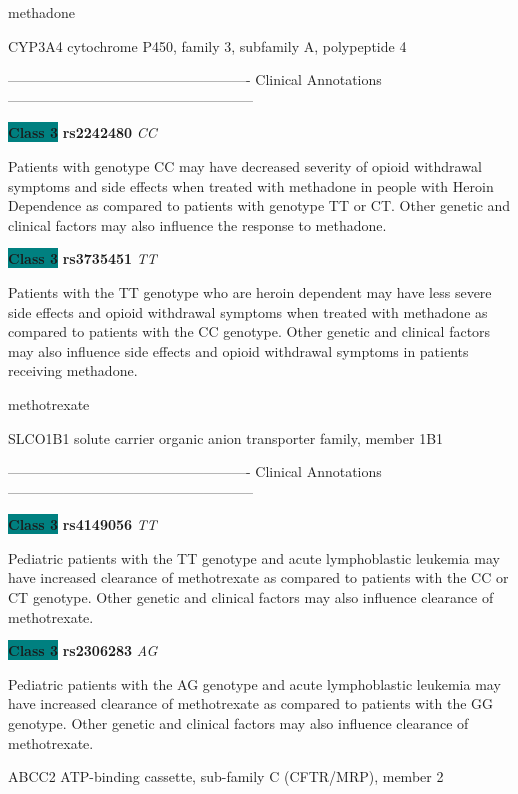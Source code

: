 \documentclass{resume} %
\begin{document}
\begin{rSection}{ methadone }
\begin{rSubsection}{ CYP3A4 }{ cytochrome P450, family 3, subfamily A, polypeptide 4 }{}{}
\item[] ---------------------------------------------------- Clinical Annotations -----------------------------------------------------\newline
\item \textbf{\colorbox{teal} {Class 3}} \textbf{ rs2242480 } \textit{ CC }
\item[] Patients with genotype CC may have decreased severity of opioid withdrawal symptoms and side effects when treated with methadone in people with Heroin Dependence as compared to patients with genotype TT or CT. Other genetic and clinical factors may also influence the response to methadone.\item \textbf{\colorbox{teal} {Class 3}} \textbf{ rs3735451 } \textit{ TT }
\item[] Patients with the TT genotype who are heroin dependent may have less severe side effects and opioid withdrawal symptoms when treated with methadone as compared to patients with the CC genotype. Other genetic and clinical factors may also influence side effects and opioid withdrawal symptoms in patients receiving methadone.
\end{rSubsection}

\end{rSection}\begin{rSection}{ methotrexate }
\item[]

\begin{rSubsection}{ SLCO1B1 }{ solute carrier organic anion transporter family, member 1B1 }{}{}
\item[]

\item[] ---------------------------------------------------- Clinical Annotations -----------------------------------------------------\newline
\item \textbf{\colorbox{teal} {Class 3}} \textbf{ rs4149056 } \textit{ TT }
\item[] Pediatric patients with the TT genotype and acute lymphoblastic leukemia may have increased clearance of methotrexate as compared to patients with the CC or CT genotype. Other genetic and clinical factors may also influence clearance of methotrexate.\item \textbf{\colorbox{teal} {Class 3}} \textbf{ rs2306283 } \textit{ AG }
\item[] Pediatric patients with the AG genotype and acute lymphoblastic leukemia may have increased clearance of methotrexate as compared to patients with the GG genotype. Other genetic and clinical factors may also influence clearance of methotrexate. 
\end{rSubsection}\begin{rSubsection}{ ABCC2 }{ ATP-binding cassette, sub-family C (CFTR/MRP), member 2 }{}{}
\item[]


\end{rSubsection}
\end{rSection}
\end{document}
